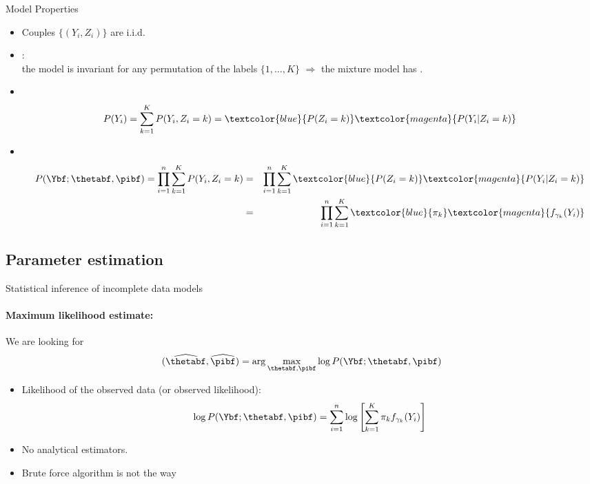 \begin{frame}[fragile]{Model Properties}
\begin{itemize}
\item Couples $\{(Y_i, Z_i)\}$ are i.i.d.
\item {}:\\ the model is invariant for any permutation of the labels $\{1,
  \dots, K\}$ $\Rightarrow$ the mixture model has .
\item{}\\
$$P(Y_i)=\sum_{k=1}^K P(Y_i, Z_i=k)=\textcolor{blue}{P(Z_i=k)} \textcolor{magenta}{P(Y_i | Z_i=k)} $$
\item{}\\
{\small
\begin{eqnarray*}
P(\Ybf ; \thetabf, \pibf)= \prod_{i=1}^n \sum_{k=1}^K P(Y_i , Z_i=k)  
&=& \prod_{i=1}^n \sum_{k=1}^K \textcolor{blue}{P(Z_i=k)} \textcolor{magenta}{P(Y_i | Z_i=k)} \\ 
&=& \prod_{i=1}^n \sum_{k=1}^K \textcolor{blue}{\pi_k} \textcolor{magenta}{f_{\gamma_k}(Y_i)} 
\end{eqnarray*}
}
\end{itemize}
\end{frame}

\subsection*{Parameter estimation}


\begin{frame}{Statistical inference of incomplete data models} 
 \paragraph{Maximum likelihood estimate:} We are looking for
  $$
  (\widehat{\thetabf},\widehat{\pibf}) = \arg\max_{\thetabf, \pibf} \log P(\Ybf; \thetabf, \pibf)
  $$
  \begin{itemize}
  \item Likelihood of the observed data (or observed likelihood):
    $$
    \log P(\Ybf; \thetabf, \pibf)=
    \sum_{i=1}^n \log \left[\sum_{k=1}^K \pi_k f_{ \gamma_k}(Y_i)\right]
    $$
  \item No analytical estimators. 
  \item Brute force algorithm is not the way
  \end{itemize}
\end{frame}


